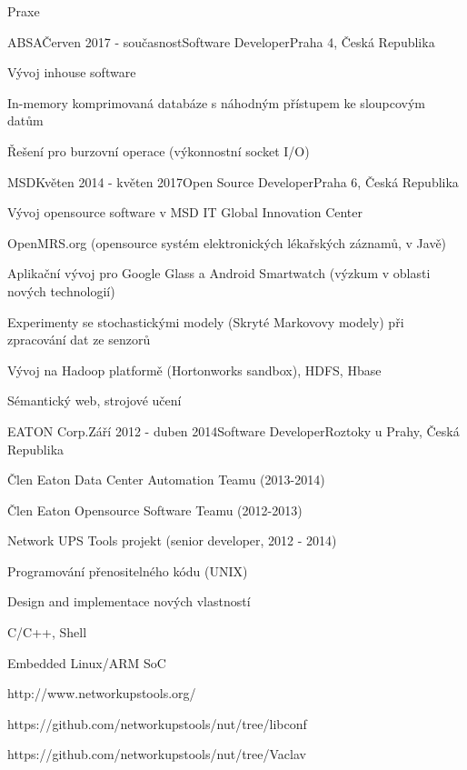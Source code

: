 \documentclass{resume} %
\begin{document}
\begin{rSection}{Praxe}

\begin{rSubsection}{ABSA}{\v{C}erven 2017 - sou\v{c}asnost}{Software Developer}{Praha 4, \v{C}esk\'{a} Republika}
\item V\'{y}voj inhouse software
\item In-memory komprimovan\'{a} datab\'{a}ze s n\'{a}hodn\'{y}m p\v{r}\'{i}stupem ke sloupcov\'{y}m dat\r{u}m
\item \v{R}e\v{s}en\'{i} pro burzovn\'{i} operace (v\'{y}konnostn\'{i} socket I/O)
\end{rSubsection}


\begin{rSubsection}{MSD}{Kv\v{e}ten 2014 - kv\v{e}ten 2017}{Open Source Developer}{Praha 6, \v{C}esk\'{a} Republika}
\item V\'{y}voj opensource software v MSD IT Global Innovation Center
\item OpenMRS.org (opensource syst\'{e}m elektronick\'{y}ch l\'{e}ka\v{r}sk\'{y}ch z\'{a}znam\r{u}, v Jav\v{e})
\item Aplika\v{c}n\'{i} v\'{y}voj pro Google Glass a Android Smartwatch (v\'{y}zkum v oblasti nov\'{y}ch technologi\'{i})
\item Experimenty se stochastick\'{y}mi modely (Skryt\'{e} Markovovy modely) p\v{r}i zpracov\'{a}n\'{i} dat ze senzor\r{u}
\item V\'{y}voj na Hadoop platform\v{e} (Hortonworks sandbox), HDFS, Hbase
\item S\'{e}mantick\'{y} web, strojov\'{e} u\v{c}en\'{i}
\end{rSubsection}


\begin{rSubsection}{EATON Corp.}{Z\'{a}\v{r}\'{i} 2012 - duben 2014}{Software Developer}{Roztoky u Prahy, \v{C}esk\'{a} Republika}
\item \v{C}len Eaton Data Center Automation Teamu (2013-2014)
\item \v{C}len Eaton Opensource Software Teamu (2012-2013)
\item Network UPS Tools projekt (senior developer, 2012 - 2014)
\item Programov\'{a}n\'{i} p\v{r}enositeln\'{e}ho k\'{o}du (UNIX)
\item Design and implementace nov\'{y}ch vlastnost\'{i}
\item C/C++, Shell
\item Embedded Linux/ARM SoC
\item http://www.networkupstools.org/
\item https://github.com/networkupstools/nut/tree/libconf
\item https://github.com/networkupstools/nut/tree/Vaclav
\end{rSubsection}


\end{rSection}
\end{document}
